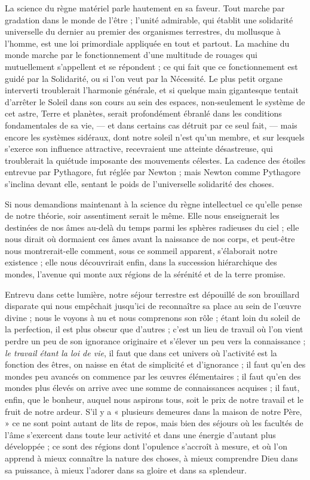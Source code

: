 \documentclass[a4paper, 11pt, oneside, landscape]{article}
\begin{document}
La science du règne matériel parle hautement en sa faveur. Tout marche par gradation dans le monde de l'être ; l'unité admirable, qui établit une solidarité universelle du dernier au premier des organismes terrestres, du mollusque à l'homme, est une loi primordiale appliquée en tout et partout. La machine du monde marche par le fonctionnement d'une multitude de rouages qui mutuellement s'appellent et se répondent ; ce qui fait que ce fonctionnement est guidé par la Solidarité, ou si l'on veut par la Nécessité. Le plus petit organe interverti troublerait l'harmonie générale, et si quelque main gigantesque tentait d'arrêter le Soleil dans son cours au sein des espaces, non-seulement le système de cet astre, Terre et planètes, serait profondément ébranlé dans les conditions fondamentales de sa vie, --- et dans certains cas détruit par ce seul fait, --- mais encore les systèmes sidéraux, dont notre soleil n'est qu'un membre, et sur lesquels s'exerce son influence attractive, recevraient une atteinte désastreuse, qui troublerait la quiétude imposante des mouvements célestes. La cadence des étoiles entrevue par Pythagore, fut réglée par Newton ; mais Newton comme Pythagore s'inclina devant elle, sentant le poids de l'universelle solidarité des choses.

Si nous demandions maintenant à la science du règne intellectuel ce qu'elle pense de notre théorie, soir assentiment serait le même. Elle nous enseignerait les destinées de nos âmes au-delà du temps parmi les sphères radieuses du ciel ; elle nous dirait où dormaient ces âmes avant la naissance de nos corps, et peut-être nous montrerait-elle comment, sous ce sommeil apparent, s'élaborait notre existence ; elle nous découvrirait enfin, dans la succession hiérarchique des mondes, l'avenue qui monte aux régions de la sérénité et de la terre promise.

Entrevu dans cette lumière, notre séjour terrestre est dépouillé de son brouillard disparate qui nous empêchait jusqu'ici de reconnaître sa place au sein de l'œuvre divine ; nous le voyons à nu et nous comprenons son rôle ; étant loin du soleil de la perfection, il est plus obscur que d'autres ; c'est un lieu de travail où l'on vient perdre un peu de son ignorance originaire et s'élever un peu vers la connaissance ; \emph{le travail étant la loi de vie}, il faut que dans cet univers où l'activité est la fonction des êtres, on naisse en état de simplicité et d'ignorance ; il faut qu'en des mondes peu avancés on commence par les œuvres élémentaires ; il faut qu'en des mondes plus élevés on arrive avec une somme de connaissances acquises ; il faut, enfin, que le bonheur, auquel nous aspirons tous, soit le prix de notre travail et le fruit de notre ardeur. S'il y a « plusieurs demeures dans la maison de notre Père, » ce ne sont point autant de lits de repos, mais bien des séjours où les facultés de l'âme s'exercent dans toute leur activité et dans une énergie d'autant plus développée ; ce sont des régions dont l'opulence s'accroît à mesure, et où l'on apprend à mieux connaître la nature des choses, à mieux comprendre Dieu dans sa puissance, à mieux l'adorer dans sa gloire et dans sa splendeur.
\end{document}
